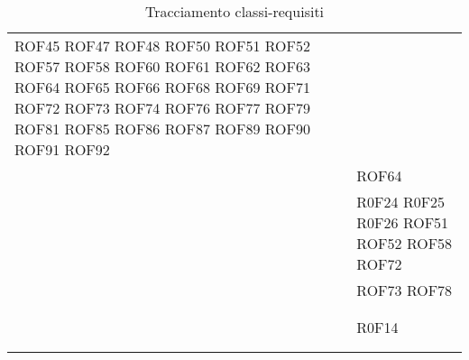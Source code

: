 \documentclass[../DefinizioneDiProdotto.tex]{subfiles}
\begin{document}
\begin{longtable}{p{8.5cm}!{\VRule[1pt]}p{2.5cm}}
ROF45 \newline 
ROF47 \newline 
ROF48 \newline 
ROF50 \newline 
ROF51 \newline 
ROF52 \newline 
ROF57 \newline 
ROF58 \newline 
ROF60 \newline 
ROF61 \newline 
ROF62 \newline 
ROF63 \newline 
ROF64 \newline 
ROF65 \newline 
ROF66 \newline 
ROF68 \newline 
ROF69 \newline 
ROF71 \newline 
ROF72 \newline 
ROF73 \newline 
ROF74 \newline 
ROF76 \newline 
ROF77 \newline 
ROF79 \newline 
ROF81 \newline 
ROF85 \newline 
ROF86 \newline 
ROF87 \newline 
ROF89 \newline 
ROF90 \newline 
ROF91 \newline 
ROF92 \\
 & ROF64 \\
 & R0F24 \newline 
R0F25 \newline 
R0F26 \newline 
ROF51 \newline 
ROF52 \newline 
ROF58 \newline 
ROF72 \\
 & ROF73 \newline 
ROF78 \\
 &  \\
 &  \\
 & R0F14 \\
 &  \\
\caption{Tracciamento classi-requisiti}
\end{longtable}
\end{document}
